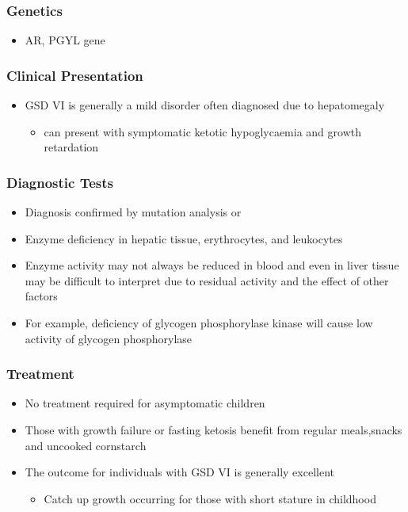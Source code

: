 \documentclass{scrartcl}
\begin{document}
\subsubsection{Genetics}
\label{sec:org51aa811}
\begin{itemize}
\item AR, PGYL gene
\end{itemize}

\subsubsection{Clinical Presentation}
\label{sec:org7713e2b}
\begin{itemize}
\item GSD VI is generally a mild disorder often diagnosed due to hepatomegaly
\begin{itemize}
\item can present with symptomatic ketotic hypoglycaemia and growth retardation
\end{itemize}
\end{itemize}
\subsubsection{Diagnostic Tests}
\label{sec:org95275f3}
\begin{itemize}
\item Diagnosis confirmed by mutation analysis or
\item Enzyme deficiency in hepatic tissue, erythrocytes, and leukocytes
\item Enzyme activity may not always be reduced in blood and even in liver
tissue may be difficult to interpret due to residual activity and
the effect of other factors
\item For example, deficiency of glycogen phosphorylase kinase will cause
low activity of glycogen phosphorylase
\end{itemize}
\subsubsection{Treatment}
\label{sec:org1d5eaa7}
\begin{itemize}
\item No treatment required for asymptomatic children
\item Those with growth failure or fasting ketosis benefit from regular
meals,snacks and uncooked cornstarch
\item The outcome for individuals with GSD VI is generally excellent
\begin{itemize}
\item Catch up growth occurring for those with short stature in childhood
\end{itemize}
\end{itemize}
\end{document}
